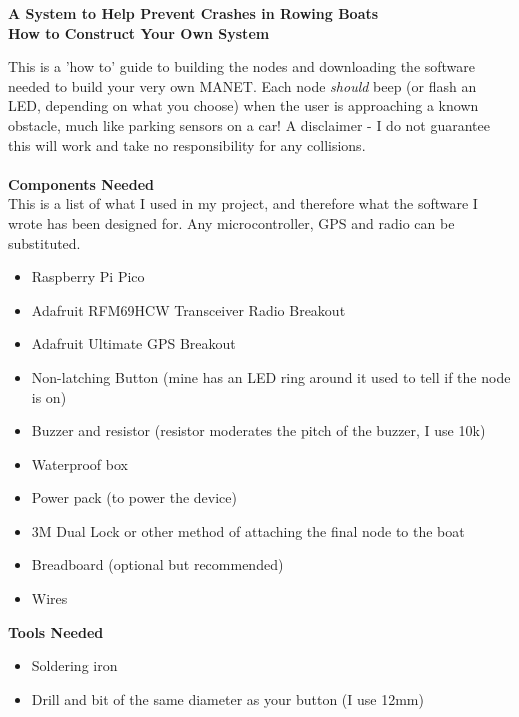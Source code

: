 \documentclass[12pt,a4paper]{report}
\begin{document}
\begin{center}
\large \textbf{A System to Help Prevent Crashes in Rowing Boats \\ How to Construct Your Own System}
\end{center}
 
This is a 'how to' guide to building the nodes and downloading the software needed to build your very own MANET. Each node \emph{should} beep (or flash an LED, depending on what you choose) when the user is approaching a known obstacle, much like parking sensors on a car! A disclaimer - I do not guarantee this will work and take no responsibility for any collisions. \\ \\


\textbf{Components Needed} \\
This is a list of what I used in my project, and therefore what the software I wrote has been designed for. Any microcontroller, GPS and radio can be substituted.\begin{itemize} 
\item Raspberry Pi Pico
\item Adafruit RFM69HCW Transceiver Radio Breakout
\item Adafruit Ultimate GPS Breakout
\item Non-latching Button (mine has an LED ring around it used to tell if the node is on)
\item Buzzer and resistor (resistor moderates the pitch of the buzzer, I use 10k) 
\item Waterproof box
\item Power pack (to power the device)
\item 3M Dual Lock or other method of attaching the final node to the boat
\item Breadboard (optional but recommended)
\item Wires 
\end{itemize}
\bigskip


\textbf{Tools Needed} \\
\begin{itemize}
\item Soldering iron
\item Drill and bit of the same diameter as your button (I use 12mm)
\end{itemize}
\bigskip
\end{document}
